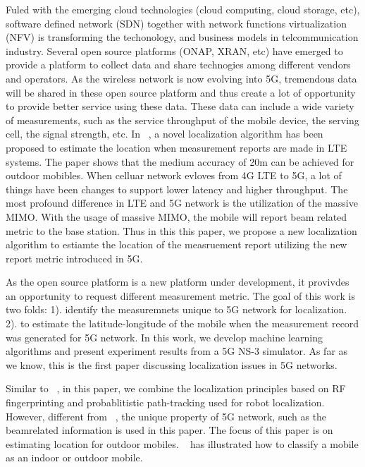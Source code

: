 \documentclass[conference, 10pt]{IEEEtran}
\begin{document}
Fuled with the emerging cloud technologies (cloud computing, cloud storage, etc), software defined network (SDN) together with 
network functions virtualization (NFV) is transforming the techonology, and business models in telcommunication industry.
Several open source platforms (ONAP, XRAN, etc) have emerged to provide a platform to collect data and share technogies among different 
vendors and operators. As the wireless network is now evolving into 5G, tremendous data will be shared in these open source platform and thus create 
a lot of opportunity to provide better service using these data. These data can include a wide variety of measurements, such as the service throughput of the mobile 
device, the serving cell, the signal strength, etc. In ~\cite{Pantelis2016Localization}, a novel localization algorithm has been proposed to estimate 
the location when measurement reports are made in LTE systems. The paper shows that the medium accuracy of 20m can be achieved for outdoor mobibles. 
When celluar network evloves from 4G LTE to 5G, a lot of things have been changes to support lower latency and higher throughput. The most profound difference in LTE and 5G 
network is the utilization of the massive MIMO. With the usage of massive MIMO, the mobile will report beam related metric to the base station. Thus in this 
this paper, we propose a new localization algorithm to estiamte the location of the measruement report utilizing the new report metric introduced in 5G.
 

As the open source platform is a new platform under development, it provivdes an opportunity to request different measurement 
metric. 
The goal of this work is two folds: 1). identify the measuremnets unique to 5G network for localization.
2). to estimate the latitude-longitude of the mobile when the measurement record was
generated for 5G network. In this work, we develop machine learning algorithms
and present experiment results from a 5G NS-3 simulator. As far as we know, this is the first paper discussing localization issues in 5G networks. 



Similar to ~\cite{Pantelis2016Localization}, in this paper, we combine the localization principles based on RF 
fingerprinting and probablitistic path-tracking used for robot localization. However, different from ~\cite{Pantelis2016Localization}, the unique property of 5G network, such as the beamrelated 
information is used in this paper. The focus of this paper is on estimating location for outdoor mobiles. ~\cite{Pantelis2016Localization}
has illustrated how to classify a mobile as an indoor or outdoor mobile.
\end{document}

